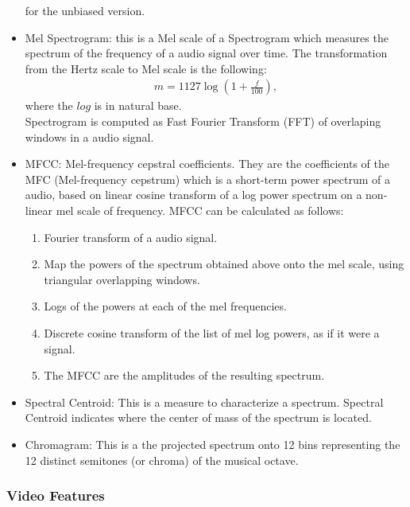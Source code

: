 \documentclass[oneside]{report}
\begin{document}
\begin{itemize}
        for the unbiased version. \\
        
        \item  Mel Spectrogram: this is a Mel scale of a Spectrogram which measures the spectrum of the frequency of a audio signal over time.
        The transformation from the Hertz scale to Mel scale is the following:
        \begin{align*}
            m = 1127\log(1 + \frac{f}{100}),
        \end{align*}
        where the $log$ is in natural base. \\
        Spectrogram is computed as Fast Fourier Transform (FFT) of overlaping windows in a audio signal. 
        
        \item  MFCC: Mel-frequency cepstral coefficients. They are the coefficients of the MFC (Mel-frequency cepstrum) which is a short-term power spectrum of a audio, based on linear cosine transform of a log power spectrum on a non-linear mel scale of frequency. MFCC can be calculated as follows:
            \begin{enumerate}
                \item  Fourier transform of a audio signal.
                \item Map the powers of the spectrum obtained above onto the mel scale, using triangular overlapping windows.
                \item Logs of the powers at each of the mel frequencies.
                \item Discrete cosine transform of the list of mel log powers, as if it were a signal.
                \item The MFCC are the amplitudes of the resulting spectrum.
            \end{enumerate}
        
        \item Spectral Centroid: This is a measure to characterize a spectrum. Spectral Centroid indicates where the center of mass of the spectrum is located.
        
        \item Chromagram: This is a the projected spectrum onto 12 bins representing the 12 distinct semitones (or chroma) of the musical octave.
        
        \end{itemize}
           
    \subsubsection{Video Features}
    
\end{document}
